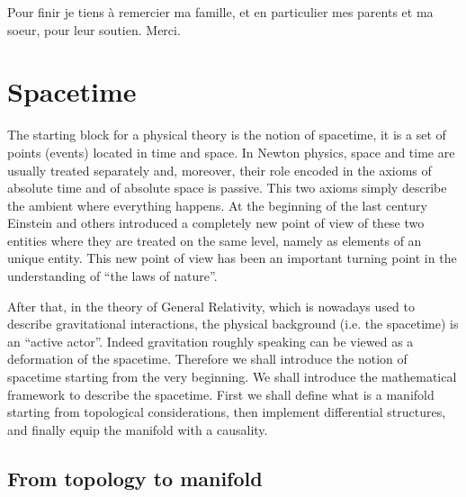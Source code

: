 \documentclass[11pt]{book}
\theoremstyle{break}
\begin{document}
\bigskip


Pour finir je tiens à remercier ma famille, et en particulier mes parents et ma soeur, pour leur soutien. Merci.








\setcounter{section}{0}
\appendix


\chapter{Spacetime}
\label{p:SPACETIME}


The starting block for a physical theory is the notion of spacetime, it is a set of points (events) located in time and space. In Newton physics, space and time are usually treated separately and, moreover, their role encoded in the axioms of absolute time and of absolute space is passive. This two axioms simply describe the ambient where everything happens. At the beginning of the last century Einstein and others introduced a completely new point of view of these two entities where they are treated on the same level, namely as elements of an unique entity. This new point of view has been an important turning point in the understanding of ``the laws of nature''. 


After that, in the theory of General Relativity, which is nowadays used to describe gravitational interactions, the physical background (i.e. the spacetime) is an ``active actor''. Indeed gravitation roughly speaking can be viewed as a deformation of the spacetime. Therefore we shall introduce the notion of spacetime starting from the very beginning. We shall introduce the mathematical framework to describe the spacetime. First we shall define what is a manifold starting from topological considerations, then implement differential structures, and finally equip the manifold with a causality.


\section{From topology to manifold}
\label{p:TOPO_M}
\end{document}
